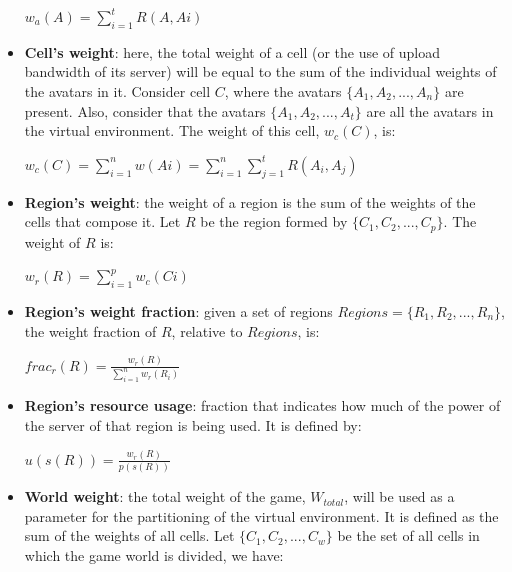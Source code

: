 \begin{itemize}
		\begin{center}
			$\displaystyle w_a(A) = \sum_{i=1}^{t} R(A,Ai)$
		\end{center}
				
	\item \textbf{Cell's weight}: here, the total weight of a cell (or the use of upload bandwidth of its server) will be equal to the sum of the individual weights of the avatars in it. Consider cell $C$, where the avatars $\{A_1, A_2, ..., A_n\}$ are present. Also, consider that the avatars $\{A_1, A_2, ..., A_t\}$ are all the avatars in the virtual environment. The weight of this cell, $w_c(C)$, is:
	
		\begin{center}		
			$\displaystyle w_c(C) = \sum_{i=1}^{n} w(Ai) = \sum_{i=1}^{n} \sum_{j=1}^{t} R(A_i,A_j)$
		\end{center}
		
	\item \textbf{Region's weight}: the weight of a region is the sum of the weights of the cells that compose it. Let $R$ be the region formed by $\{C_1, C_2, ..., C_p\}$. The weight of $R$ is:
	
		\begin{center}
			$\displaystyle w_r(R) = \sum_{i=1}^{p} w_c(Ci)$
		\end{center}
		
		\item \textbf{Region's weight fraction}: given a set of regions $Regions  = \{R_1, R_2, ..., R_n\}$, the weight fraction of $R$, relative to $Regions$, is:
	
		\begin{center}
			$frac_r(R) = \frac{\displaystyle w_r(R)}{\displaystyle\sum_{i=1}^{n} w_r(R_i)}$
		\end{center}
		
	\item \textbf{Region's resource usage}: fraction that indicates how much of the power of the server of that region is being used. It is defined by:
	
		\begin{center}
			$u(s(R)) = \frac{\displaystyle w_r(R)}{\displaystyle p(s(R))}$	
		\end{center}
		
	\item \textbf{World weight}: the total weight of the game, $W_{total}$, will be used as a parameter for the partitioning of the virtual environment. It is defined as the sum of the weights of all cells. Let $\{C_1, C_2, ..., C_w\}$ be the set of all cells in which the game world is divided, we have:
	

\end{itemize}

